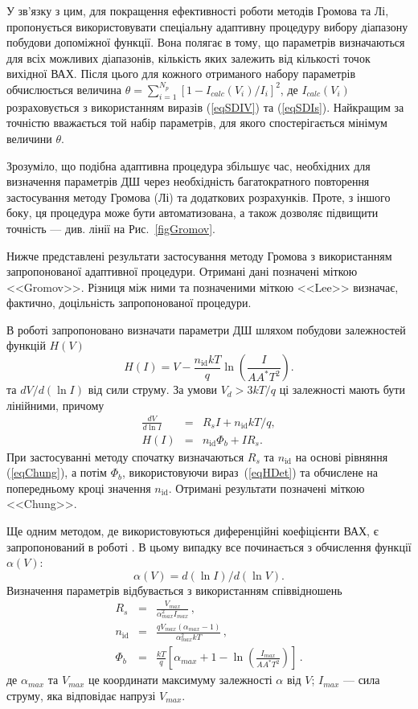 \documentclass[a4paper,14pt,oneside,openany]{memoir}
\begin{document}
У зв'язку з цим, для покращення ефективності роботи методів Громова та Лі, пропонується використовувати спеціальну адаптивну процедуру вибору діапазону побудови допоміжної функції.
Вона полягає в тому, що параметрів визначаються для всіх можливих діапазонів, кількість яких залежить від кількості точок вихідної ВАХ.
Після цього для кожного отриманого набору параметрів обчислюється величина $\theta=\sum_{i=1}^{N_p}[1-I_{calc}(V_i)/I_i]^2$,
де $I_{calc}(V_i)$ розраховується з використанням виразів (\ref{eqSDIV}) та (\ref{eqSDIs}).
Найкращим за точністю вважається той набір параметрів, для якого спостерігається мінімум величини $\theta$.

Зрозуміло, що подібна адаптивна процедура збільшує час, необхідних для визначення параметрів ДШ через необхідність багатократного повторення застосування методу Громова (Лі) та додаткових розрахунків.
Проте, з іншого боку, ця процедура може бути автоматизована, а також дозволяє підвищити точність --- див. лінії на Рис.~\ref{figGromov}.

Нижче представлені результати застосування методу Громова з використанням запропонованої адаптивної процедури.
Отримані дані позначені міткою <<Gromov>>.
Різниця між ними та позначеними міткою <<Lee>> визначає, фактично, доцільність запропонованої процедури.

В роботі \cite{Cheung} запропоновано визначати параметри ДШ шляхом побудови залежностей функцій $H(V)$
\begin{equation}
\label{eqH}
H(I)=V-\frac{n_\mathrm{id}kT}{q}\ln\left(\frac{I}{AA^*T^2}\right).
\end{equation}
та $dV/d(\ln I)$ від сили струму.
За умови $V_d>3kT/q$ ці залежності мають бути лінійними, причому
\begin{eqnarray}
\label{eqChung}
\frac{dV}{d\ln I}&=&R_sI+n_\mathrm{id}kT/q,
\\
\label{eqHDet}
H(I)&=&n_\mathrm{id}\Phi_b+IR_s.
\end{eqnarray}
При застосуванні методу спочатку визначаються $R_s$ та  $n_\mathrm{id}$ на основі рівняння (\ref{eqChung}),
а потім  $\Phi_b$, використовуючи вираз~(\ref{eqHDet}) та обчислене на попередньому кроці значення $n_\mathrm{id}$.
Отримані результати позначені міткою <<Chung>>.

Ще одним методом, де використовуються диференційні коефіцієнти ВАХ, є запропонований в роботі \cite{Mikhelashvili}.
В цьому випадку все починається з обчислення функції  $\alpha(V)$:
\begin{equation}
\label{eqMikh}
\alpha(V)=d(\ln I)/d(\ln V).
\end{equation}
Визначення параметрів відбувається з використанням співвідношень
\begin{eqnarray}
\label{eqMikhDet}
R_s&=&\frac{V_{max}}{\alpha^2_{max}I_{max}}\,,
\\
n_\mathrm{id}&=&\frac{qV_{max}(\alpha_{max}-1)}{\alpha_{max}^2kT}\,,
\\
\Phi_b&=&\frac{kT}{q}\left[\alpha_{max}+1-\ln\left(\frac{I_{max}}{AA^*T^2}\right)\right]\,.\label{eqMikhDetFi}
\end{eqnarray}
де
$\alpha_{max}$ та $V_{max}$  це координати максимуму залежності $\alpha$ від $V$;
$I_{max}$ --- сила струму, яка відповідає напрузі $V_{max}$.
\end{document}
